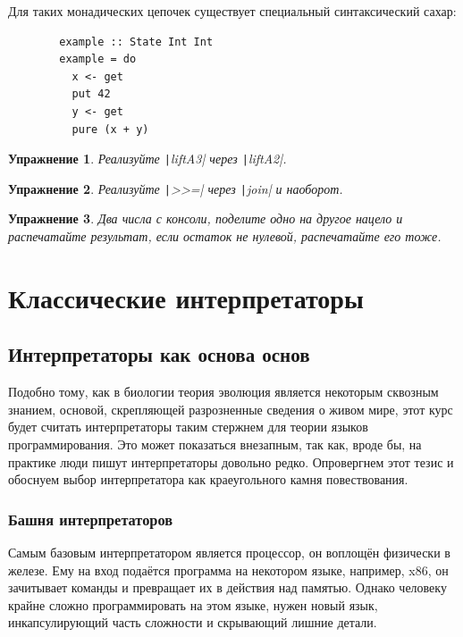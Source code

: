 \documentclass[12pt]{article}
\newtheorem{task}{Упражнение}
\begin{document}
    Для таких монадических цепочек существует специальный синтаксический сахар:
    \begin{verbatim}
        example :: State Int Int
        example = do
          x <- get
          put 42
          y <- get
          pure (x + y)
    \end{verbatim}

    \begin{task}
        Реализуйте \texttt|liftA3| через \texttt|liftA2|.
    \end{task}

    \begin{task}
        Реализуйте \texttt|>>=| через \texttt|join| и наоборот.
    \end{task}

    \begin{task}
        Два числа с консоли, поделите одно на другое нацело и распечатайте результат, если остаток не нулевой, распечатайте его тоже.
    \end{task}


    \clearpage


    \section{Классические интерпретаторы}

    \subsection{Интерпретаторы как основа основ}

    Подобно тому, как в биологии теория эволюция является некоторым сквозным знанием, основой, скрепляющей разрозненные сведения о живом мире, этот курс будет считать интерпретаторы таким стержнем для теории языков программирования.
    Это может показаться внезапным, так как, вроде бы, на практике люди пишут интерпретаторы довольно редко.
    Опровергнем этот тезис и обоснуем выбор интерпретатора как краеугольного камня повествования.

    \subsubsection{Башня интерпретаторов}

    Самым базовым интерпретатором является процессор, он воплощён физически в железе.
    Ему на вход подаётся программа на некотором языке, например, x86, он зачитывает команды и превращает их в действия над памятью.
    Однако человеку крайне сложно программировать на этом языке, нужен новый язык, инкапсулирующий часть сложности и скрывающий лишние детали.
\end{document}
